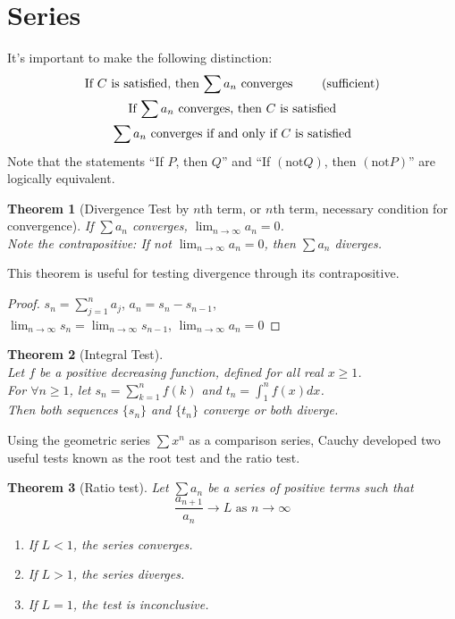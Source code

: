 \documentclass[twoside]{amsart}
\theoremstyle{plain}
\newtheorem{theorem}{Theorem}
\theoremstyle{definition}
\begin{document}
\section{ Series }
It's important to make the following distinction:
\begin{gather*}
  \text{ If $C$ is satisfied, then $\sum a_n$ converges \quad \quad (sufficient) } \\
  \text{ If $\sum a_n$ converges, then $C$ is satisfied } \\
  \text{ $\sum a_n$ converges if and only if $C$ is satisfied }
\end{gather*}
Note that the statements ``If $P$, then $Q$'' and ``If $(\text{not} Q)$, then $(\text{not} P)$'' are logically equivalent.  

\begin{theorem}[Divergence Test by $n$th term, or $n$th term, necessary condition for convergence]
  If $\sum a_n$ converges, $\lim_{n \to \infty} a_n = 0$.  \medskip \\
  Note the contrapositive: If not $\lim_{n \to \infty} a_n = 0$, then $\sum a_n$ diverges.  
\end{theorem}
This theorem is useful for testing divergence through its contrapositive.  

\begin{proof}
  $s_n = \sum_{j=1}^n a_j$, \quad \quad $a_n = s_n - s_{n-1}$, \\
   $\lim_{n\to \infty} s_n = \lim_{n\to \infty} s_{n-1}$, \quad $\lim_{n\to \infty} a_n = 0$
\end{proof}

\begin{theorem}[Integral Test] \quad \\
Let $f$ be a positive decreasing function, defined for all real $x \geq 1$.  \\
For $\forall n \geq 1$, let $s_n = \sum_{k=1}^n f(k)$ and $t_n = \int_1^n f(x) dx$.  \\
Then both sequences  $\{ s_n \}$ and $\{ t_n \}$ converge or both diverge.  
\end{theorem}

Using the geometric series $\sum x^n$ as a comparison series, Cauchy developed two useful tests known as the root test and the ratio test.  

\begin{theorem}[Ratio test] Let $\sum a_n$ be a series of positive terms such that 
\[
\frac{ a_{n+1} }{ a_n } \to L \text{ as } n \to \infty
\]
\begin{enumerate}
  \item If $L <1$, the series converges.  
  \item If $L >1$, the series diverges.  
  \item If $L=1$, the test is inconclusive.  
\end{enumerate}
\end{theorem}
\end{document}
